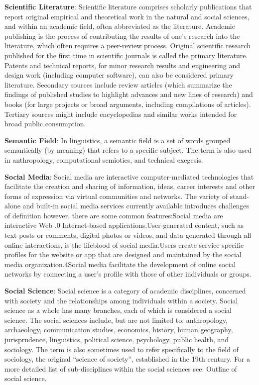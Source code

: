 \documentclass[]{book}
\theoremstyle{definition}
\theoremstyle{definition}
\theoremstyle{definition}
\theoremstyle{remark}
\begin{document}
\textbf{Scientific Literature}: Scientific literature comprises
scholarly publications that report original empirical and theoretical
work in the natural and social sciences, and within an academic field,
often abbreviated as the literature. Academic publishing is the process
of contributing the results of one's research into the literature, which
often requires a peer-review process. Original scientific research
published for the first time in scientific journals is called the
primary literature. Patents and technical reports, for minor research
results and engineering and design work (including computer software),
can also be considered primary literature. Secondary sources include
review articles (which summarize the findings of published studies to
highlight advances and new lines of research) and books (for large
projects or broad arguments, including compilations of articles).
Tertiary sources might include encyclopedias and similar works intended
for broad public consumption.

\textbf{Semantic Field}: In linguistics, a semantic field is a set of
words grouped semantically (by meaning) that refers to a specific
subject. The term is also used in anthropology, computational semiotics,
and technical exegesis.

\textbf{Social Media}: Social media are interactive computer-mediated
technologies that facilitate the creation and sharing of information,
ideas, career interests and other forms of expression via virtual
communities and networks. The variety of stand-alone and built-in social
media services currently available introduces challenges of definition
however, there are some common features:Social media are interactive Web
.0 Internet-based applications.User-generated content, such as text
posts or comments, digital photos or videos, and data generated through
all online interactions, is the lifeblood of social media.Users create
service-specific profiles for the website or app that are designed and
maintained by the social media organization.4Social media facilitate the
development of online social networks by connecting a user's profile
with those of other individuals or groups.

\textbf{Social Science}: Social science is a category of academic
disciplines, concerned with society and the relationships among
individuals within a society. Social science as a whole has many
branches, each of which is considered a social science. The social
sciences include, but are not limited to: anthropology, archaeology,
communication studies, economics, history, human geography,
jurisprudence, linguistics, political science, psychology, public
health, and sociology. The term is also sometimes used to refer
specifically to the field of sociology, the original ``science of
society'', established in the 19th century. For a more detailed list of
sub-disciplines within the social sciences see: Outline of social
science.
\end{document}
